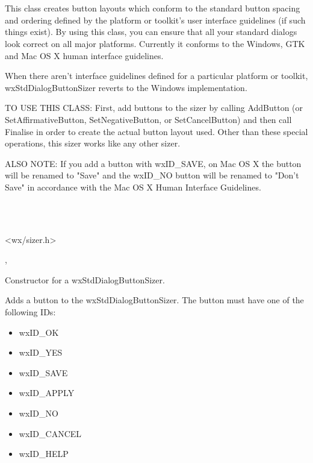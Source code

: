\section{}\label{wxstddialogbuttonsizer}

This class creates button layouts which conform to the standard button spacing and ordering defined by the platform or toolkit's user interface guidelines (if such things exist). By using this class, you can ensure that all your standard dialogs look correct on all major platforms. Currently it conforms to the Windows, GTK and Mac OS X human interface guidelines.

When there aren't interface guidelines defined for a particular platform or toolkit, wxStdDialogButtonSizer reverts to the Windows implementation. 

TO USE THIS CLASS: First, add buttons to the sizer by calling AddButton (or SetAffirmativeButton, SetNegativeButton, or SetCancelButton) and then call Finalise in order to create the actual button layout used. Other than these special operations, this sizer works like any other sizer. 

ALSO NOTE: If you add a button with wxID_SAVE, on Mac OS X the button will be renamed to "Save" and the wxID_NO button will be renamed to "Don't Save" in accordance with the Mac OS X Human Interface Guidelines.


\\
\\


<wx/sizer.h>


, 


Constructor for a wxStdDialogButtonSizer.

\label{wxstddialogbuttonsizeraddbutton}


Adds a button to the wxStdDialogButtonSizer. The button must have one of the following IDs:

\begin{itemize}
	\item wxID_OK
	\item wxID_YES
	\item wxID_SAVE
	\item wxID_APPLY
	\item wxID_NO
	\item wxID_CANCEL
	\item wxID_HELP
\end{itemize}

